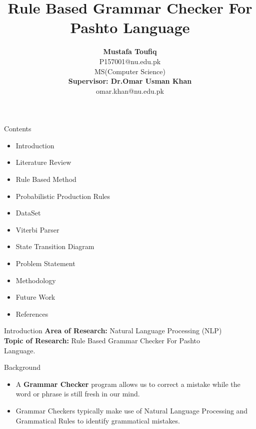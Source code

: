 \documentclass{beamer}
\title{Rule Based Grammar Checker For Pashto Language} \vspace{1em}
\author[1]{\textbf {Mustafa Toufiq} \\ P157001@nu.edu.pk \\ \vspace{1.5em} MS(Computer Science)\\ \vspace{1.5em} \textbf{Supervisor:  Dr.Omar Usman Khan}\\ omar.khan@nu.edu.pk}
\institute{\textbf{National University of Computer and Emerging Sciences}}
\begin{document}
\thispagestyle{empty}
\setcounter{page}{1}
\newpage


\newcommand{\seti}{\setcounter{saveenumi}{\value{enumi}}}
\newcommand{\conti}{\setcounter{enumi}{\value{saveenumi}}}


	
\begin{frame}
\titlepage
\end{frame}



\begin{frame}{Contents}
\begin{itemize}
\item Introduction
\vspace{0.2em}
\item Literature Review
\vspace{0.2em}
\item Rule Based Method
\vspace{0.2em}
\item Probabilistic Production Rules
\vspace{0.2em}
\item DataSet
\vspace{0.2em}
\item Viterbi Parser
\vspace{0.2em}
\item State Transition Diagram
\vspace{0.2em}
\item Problem Statement
\vspace{0.2em}
\item Methodology
\vspace{0.2em}
\item Future Work
\vspace{0.2em}
\item References
\end{itemize}
\end{frame}


\begin{frame}{Introduction}
\textbf{Area of Research:} Natural Language Processing (NLP) \\
\vspace{1em}
\textbf{Topic of Research:} Rule Based Grammar Checker For Pashto \\ \vspace{0.2em} \hspace{3.3cm} Language.
\end{frame}


\begin{frame}{Background}
\begin{itemize}
\vspace{0.5em}
\item A \textbf {Grammar Checker} program allows us to correct a mistake while the word or phrase is still fresh in our mind.
\vspace{0.5em}	
\item Grammar Checkers typically make use of Natural Language Processing and Grammatical Rules to identify grammatical mistakes.
\end{itemize}
\end{frame}
\end{document}
